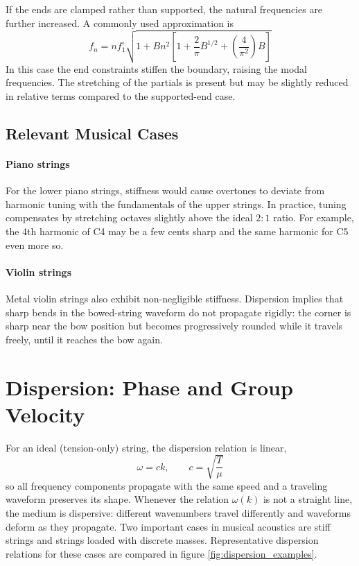 If the ends are clamped rather than supported, the natural frequencies are further increased. A commonly used approximation is
\[
f_n
 = 
n f_1^{\circ}\sqrt{1 + Bn^{2}\left[1 + \frac{2}{\pi}B^{1/2} + \left(\frac{4}{\pi^{2}}\right)B\right]}
\]
In this case the end constraints stiffen the boundary, raising the modal frequencies. The stretching of the partials is present but may be slightly reduced in relative terms compared to the supported-end case. 

\subsection{Relevant Musical Cases}

\paragraph{Piano strings} For the lower piano strings, stiffness would cause overtones to deviate from harmonic tuning with the fundamentals of the upper strings. In practice, tuning compensates by stretching octaves slightly above the ideal \( 2:1 \) ratio. For example, the 4th harmonic of C4 may be a few cents sharp and the same harmonic for C5 even more so.

\paragraph{Violin strings} Metal violin strings also exhibit non-negligible stiffness. Dispersion implies that sharp bends in the bowed-string waveform do not propagate rigidly: the corner is sharp near the bow position but becomes progressively rounded while it travels freely, until it reaches the bow again.

\section{Dispersion: Phase and Group Velocity}

For an ideal (tension-only) string, the dispersion relation is linear,
\[
\omega = ck,
\qquad c = \sqrt{\frac{T}{\mu}}
\]
so all frequency components propagate with the same speed and a traveling waveform preserves its shape. Whenever the relation \( \omega(k) \) is not a straight line, the medium is dispersive: different wavenumbers travel differently and waveforms deform as they propagate. Two important cases in musical acoustics are stiff strings and strings loaded with discrete masses. Representative dispersion relations for these cases are compared in figure \ref{fig:dispersion_examples}.

